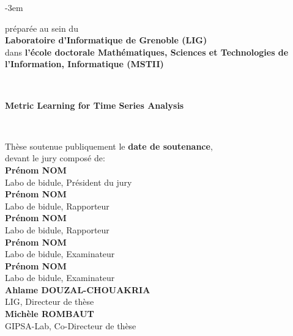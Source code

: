 \begin{titlepage}
\begin{adjustwidth}{}{-3em}
\begin{flushleft}
\vfill

\begin{flushright}
\begin{minipage}{\leftshift}
\begin{flushleft}
{préparée au sein du \\\textbf{Laboratoire d'Informatique de Grenoble (LIG)}\\
dans \textbf{l'école doctorale Mathématiques, Sciences et Technologies de l'Information, Informatique (MSTII)}}
\end{flushleft}
\end{minipage}
\end{flushright}~~\\[1cm]

\vfill

\begin{flushright}
\begin{minipage}{\leftshift}
\begin{flushleft}
{ \Huge \bfseries Metric Learning for Time Series Analysis}
\end{flushleft}
\end{minipage}
\end{flushright}~~\\[1cm]

\vfill

\begin{flushright}
\begin{minipage}{\leftshift}
\begin{flushleft}
{Thèse soutenue publiquement le \textbf{date de soutenance},\\ devant le jury composé de:}\\[\espvert]
{\textbf{Prénom NOM}}\\
{Labo de bidule, Président du jury}\\
{\textbf{Prénom NOM}}\\
{Labo de bidule, Rapporteur}\\
{\textbf{Prénom NOM}}\\
{Labo de bidule, Rapporteur}\\
{\textbf{Prénom NOM}}\\
{Labo de bidule, Examinateur}\\
{\textbf{Prénom NOM}}\\
{Labo de bidule, Examinateur}\\
{\textbf{Ahlame DOUZAL-CHOUAKRIA}}\\
{LIG, Directeur de thèse}\\
{\textbf{Michèle ROMBAUT}}\\
{GIPSA-Lab, Co-Directeur de thèse}\\
\end{flushleft}
\end{minipage}
\end{flushright}
\vfill
\end{flushleft}
\end{adjustwidth}
\end{titlepage}
\setlength{\parskip}{10pt}
\endgroup

